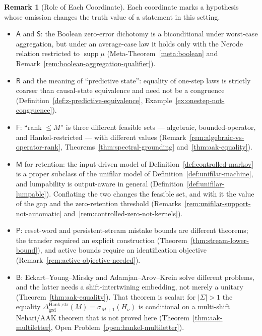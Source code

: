 \documentclass[12pt]{article}
\theoremstyle{definition}
\newtheorem{remark}[theorem]{Remark}
\newcommand{\DHankstr}{\Delta_{\mathrm{grd}}^{\mathrm{Hank,str}}}
\begin{document}
\begin{remark}[Role of Each Coordinate]
\label{rem:type-discipline-coordinates}
Each coordinate marks a hypothesis whose omission changes the truth value of a
statement in this setting.
\begin{itemize}[leftmargin=1.6em]
\item $\mathsf A$ and $\mathsf S$: the Boolean zero-error dichotomy is a
biconditional under worst-case aggregation, but under an average-case law it
holds only with the Nerode relation restricted to $\operatorname{supp}\mu$
(Meta-Theorem~\ref{meta:boolean} and
Remark~\ref{rem:boolean-aggregation-qualifier}).
\item $\mathsf R$ and the meaning of ``predictive state'': equality of
one-step laws is strictly coarser than causal-state equivalence and need not
be a congruence (Definition~\ref{def:z-predictive-equivalence},
Example~\ref{ex:onestep-not-congruence}).
\item $\mathsf F$: ``rank $\le M$'' is three different feasible sets ---
algebraic, bounded-operator, and Hankel-restricted --- with
different values (Remark~\ref{rem:algebraic-vs-operator-rank},
Theorems~\ref{thm:spectral-grounding} and~\ref{thm:aak-equality}).
\item $\mathsf M$ for retention: the input-driven model of
Definition~\ref{def:controlled-markov} is a proper subclass of the unifilar
model of Definition~\ref{def:unifilar-machine}, and lumpability is output-aware
in general (Definition~\ref{def:unifilar-lumpable}).  Conflating the two
changes the feasible set, and with it the value of the gap and the
zero-retention threshold
(Remarks~\ref{rem:unifilar-support-not-automatic}
and~\ref{rem:controlled-zero-not-kernels}).
\item $\mathsf P$: reset-word and persistent-stream mistake bounds are
different theorems; the transfer required an explicit construction
(Theorem~\ref{thm:stream-lower-bound}), and active bounds require an
identification objective (Remark~\ref{rem:active-objective-needed}).
\item $\mathsf B$: Eckart--Young--Mirsky and Adamjan--Arov--Krein solve
different problems, and the latter needs a shift-intertwining embedding, not
merely a unitary (Theorem~\ref{thm:aak-equality}).  That theorem is scalar:
for $|\Sigma|>1$ the equality $\DHankstr(M)=\sigma_{M+1}(H_\nu)$ is
conditional on a multi-shift Nehari/AAK theorem that is not proved here
(Theorem~\ref{thm:aak-multiletter}, Open Problem~\ref{open:hankel-multiletter}).
\end{itemize}
\end{remark}
\end{document}
